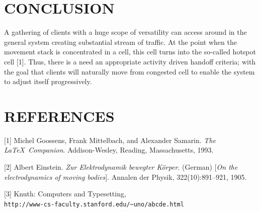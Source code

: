 \documentclass[a4paper]{IEEEtran}
\begin{document}
\section{\textbf{CONCLUSION}}
A gathering of clients with a huge scope of versatility can access around in the general system creating substantial stream of traffic. At the point when the movement stack is concentrated in a cell, this cell turns into the so-called hotspot cell [1]. Thus, there is a need an appropriate activity driven handoff criteria; with the goal that clients will naturally move from congested cell to enable the system to adjust itself progressively.
\section{\textbf{REFERENCES}}

[1] Michel Goossens, Frank Mittelbach, and Alexander Samarin.
\textit{The \LaTeX\ Companion}.
Addison-Wesley, Reading, Massachusetts, 1993.

[2] Albert Einstein.
\textit{Zur Elektrodynamik bewegter K{\"o}rper}. (German)
[\textit{On the electrodynamics of moving bodies}].
Annalen der Physik, 322(10):891–921, 1905.


[3] Knuth: Computers and Typesetting,
\\\texttt{http://www-cs-faculty.stanford.edu/\~{}uno/abcde.html}
\end{document}
